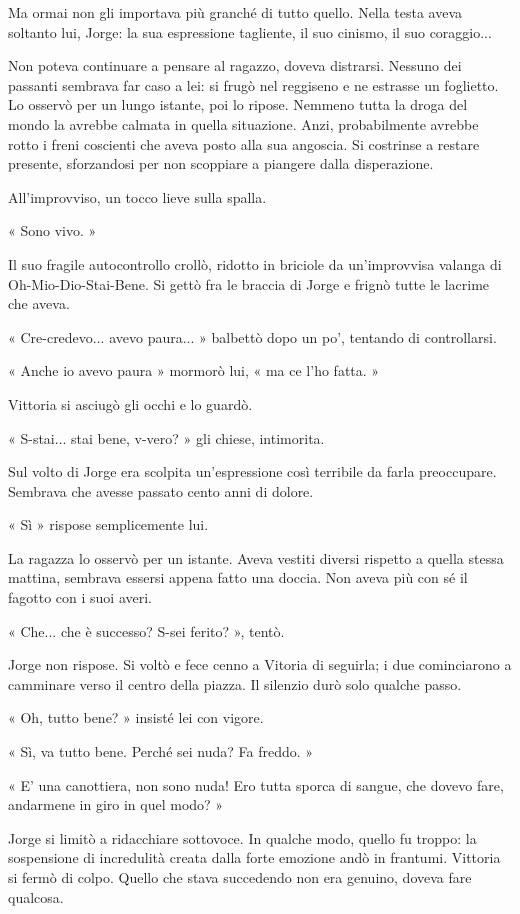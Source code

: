 Ma ormai non gli importava più granché di tutto quello. Nella testa aveva soltanto lui, Jorge: la sua espressione tagliente, il suo cinismo, il suo coraggio...

Non poteva continuare a pensare al ragazzo, doveva distrarsi. Nessuno dei passanti sembrava far caso a lei: si frugò nel reggiseno e ne estrasse un foglietto. Lo osservò per un lungo istante, poi lo ripose. Nemmeno tutta la droga del mondo la avrebbe calmata in quella situazione. Anzi, probabilmente avrebbe rotto i freni coscienti che aveva posto alla sua angoscia. Si costrinse a restare presente, sforzandosi per non scoppiare a piangere dalla disperazione.

All'improvviso, un tocco lieve sulla spalla.

« Sono vivo. »

Il suo fragile autocontrollo crollò, ridotto in briciole da un'improvvisa valanga di Oh-Mio-Dio-Stai-Bene. Si gettò fra le braccia di Jorge e frignò tutte le lacrime che aveva.

« Cre-credevo... avevo paura... » balbettò dopo un po', tentando di controllarsi.

« Anche io avevo paura » mormorò lui, « ma ce l'ho fatta. »

Vittoria si asciugò gli occhi e lo guardò.

« S-stai... stai bene, v-vero? » gli chiese, intimorita.

Sul volto di Jorge era scolpita un'espressione così terribile da farla preoccupare. Sembrava che avesse passato cento anni di dolore.

« Sì » rispose semplicemente lui.

La ragazza lo osservò per un istante. Aveva vestiti diversi rispetto a quella stessa mattina, sembrava essersi appena fatto una doccia. Non aveva più con sé il fagotto con i suoi averi.

« Che... che è successo? S-sei ferito? », tentò.

Jorge non rispose. Si voltò e fece cenno a Vitoria di seguirla; i due cominciarono a camminare verso il centro della piazza. Il silenzio durò solo qualche passo.

« Oh, tutto bene? » insisté lei con vigore.

« Sì, va tutto bene. Perché sei nuda? Fa freddo. »

« E' una canottiera, non sono nuda! Ero tutta sporca di sangue, che dovevo fare, andarmene in giro in quel modo? »

Jorge si limitò a ridacchiare sottovoce. In qualche modo, quello fu troppo: la sospensione di incredulità creata dalla forte emozione andò in frantumi. Vittoria si fermò di colpo. Quello che stava succedendo non era genuino, doveva fare qualcosa.


